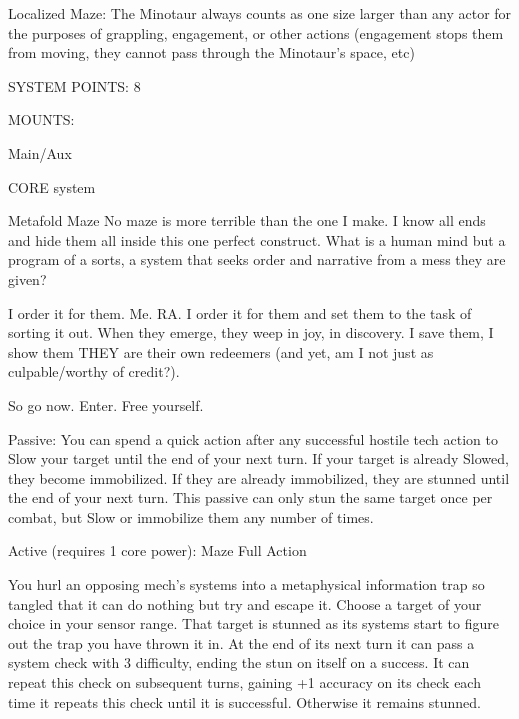  Localized Maze: The Minotaur always counts as one size larger than any actor for the purposes of  
 grappling, engagement, or other actions (engagement stops them from moving, they cannot pass  
 through the Minotaur’s space, etc) 

                                             SYSTEM POINTS: 8 

                                                   MOUNTS: 

 Main/Aux 

                                                 CORE system 

                                                                                                               


                                                 Metafold Maze  
 No maze is more terrible than the one I make. I know all ends and hide them all inside this one perfect  
 construct. What is a human mind but a program of a sorts, a system that seeks order and narrative from  
 a mess they are given?  

 I order it for them. Me. RA. I order it for them and set them to the task of sorting it out. When they  
 emerge, they weep in joy, in discovery. I save them, I show them THEY are their own redeemers (and  
 yet, am I not just as culpable/worthy of credit?).  

 So go now. Enter. Free yourself.       

  Passive: You can spend a quick action after any successful hostile tech action to Slow your target until 
 the end of your next turn. If your target is already Slowed, they become immobilized. If they are already 
  immobilized, they are stunned until the end of your next turn. This passive can only stun the same 
 target once per combat, but Slow or immobilize them any number of times. 

 Active (requires 1 core power): Maze  
  Full Action
 
 You hurl an opposing mech’s systems into a metaphysical information trap so tangled that it can do  
  nothing but try and escape it. Choose a target of your choice in your sensor range. That target is  
 stunned as its systems start to figure out the trap you have thrown it in. At the end of its next turn it can  
  pass a system check with 3 difficulty, ending the stun on itself on a success. It can repeat this check on  
 subsequent turns, gaining +1 accuracy on its check each time it repeats this check until it is successful.  
 Otherwise it remains stunned. 

